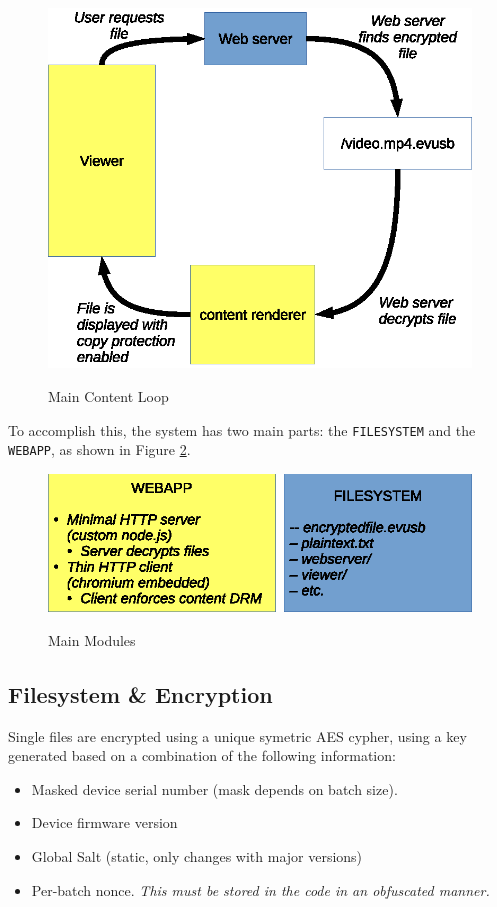 \documentclass{article}
\begin{document}
\begin{figure}
\centering
\caption{Main Content Loop}
\includegraphics{contentloop.eps}
\label{fig:contentloop}
\end{figure}

To accomplish this, the system has two main parts: the \verb+FILESYSTEM+ 
and the \verb+WEBAPP+, as shown in Figure \ref{fig:mainmods}.

\begin{figure}
\centering
\caption{Main Modules}
\includegraphics{mainmods.eps}
\label{fig:mainmods}
\end{figure}

\subsection{Filesystem \& Encryption}
Single files are encrypted using a unique symetric AES cypher, using a
key generated based on a combination of the following information:
\begin{itemize}
\item Masked device serial number (mask depends on batch size). 
\item Device firmware version
\item Global Salt (static, only changes with major versions)
\item Per-batch nonce.  \emph{This must be stored in the code in an
      obfuscated manner.}
\end{itemize}
\end{document}

